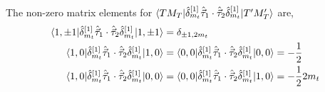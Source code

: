 \documentclass[10pt]{article}
\begin{document}
The non-zero matrix elements for $ \braket{ T M_T |  \hat{\delta}_{m_t}^{[1]} \hat{\vec{\tau}}_{1} \cdot \hat{\vec{\tau}}_{2} \hat{\delta}_{m_t}^{[1]} | T' M_T'}$ are,
\begin{align*}
	\braket{ 1, \pm 1 | \hat{\delta}_{m_t}^{[1]} \hat{\vec{\tau}}_{1} \cdot \hat{\vec{\tau}}_{2} \hat{\delta}_{m_t}^{[1]} | 1, \pm 1} &= \delta_{ \pm 1,2m_t}  \\
	\braket{ 1,0 | \hat{\delta}_{m_t}^{[1]} \hat{\vec{\tau}}_{1} \cdot \hat{\vec{\tau}}_{2} \hat{\delta}_{m_t}^{[1]} | 1,0} &= \braket{ 0,0 | \hat{\delta}_{m_t}^{[1]} \hat{\vec{\tau}}_{1} \cdot \hat{\vec{\tau}}_{2} \hat{\delta}_{m_t}^{[1]}| 0,0} = -\frac{1}{2} \\
	\braket{ 1,0 | \hat{\delta}_{m_t}^{[1]} \hat{\vec{\tau}}_{1} \cdot \hat{\vec{\tau}}_{2} \hat{\delta}_{m_t}^{[1]} | 0,0} &= \braket{ 0,0 | \hat{\delta}_{m_t}^{[1]} \hat{\vec{\tau}}_{1} \cdot \hat{\vec{\tau}}_{2} \hat{\delta}_{m_t}^{[1]}| 1,0}=-\frac{1}{2} 2m_t
\end{align*}
\end{document}
